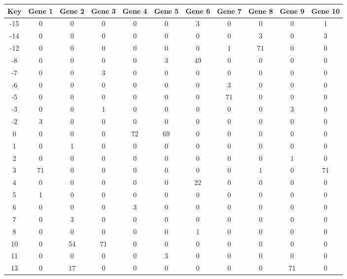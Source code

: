 \begin{tabular}{|c|c|c|c|c|c|c|c|c|c|c|}
\hline
Key & Gene 1 & Gene 2 & Gene 3 & Gene 4 & Gene 5 & Gene 6 & Gene 7 & Gene 8 & Gene 9 & Gene 10 \\
\hline
-15 & 0 & 0 & 0 & 0 & 0 & 3 & 0 & 0 & 0 & 1 \\
-14 & 0 & 0 & 0 & 0 & 0 & 0 & 0 & 3 & 0 & 3 \\
-12 & 0 & 0 & 0 & 0 & 0 & 0 & 1 & 71 & 0 & 0 \\
-8 & 0 & 0 & 0 & 0 & 3 & 49 & 0 & 0 & 0 & 0 \\
-7 & 0 & 0 & 3 & 0 & 0 & 0 & 0 & 0 & 0 & 0 \\
-6 & 0 & 0 & 0 & 0 & 0 & 0 & 3 & 0 & 0 & 0 \\
-5 & 0 & 0 & 0 & 0 & 0 & 0 & 71 & 0 & 0 & 0 \\
-3 & 0 & 0 & 1 & 0 & 0 & 0 & 0 & 0 & 3 & 0 \\
-2 & 3 & 0 & 0 & 0 & 0 & 0 & 0 & 0 & 0 & 0 \\
0 & 0 & 0 & 0 & 72 & 69 & 0 & 0 & 0 & 0 & 0 \\
1 & 0 & 1 & 0 & 0 & 0 & 0 & 0 & 0 & 0 & 0 \\
2 & 0 & 0 & 0 & 0 & 0 & 0 & 0 & 0 & 1 & 0 \\
3 & 71 & 0 & 0 & 0 & 0 & 0 & 0 & 1 & 0 & 71 \\
4 & 0 & 0 & 0 & 0 & 0 & 22 & 0 & 0 & 0 & 0 \\
5 & 1 & 0 & 0 & 0 & 0 & 0 & 0 & 0 & 0 & 0 \\
6 & 0 & 0 & 0 & 3 & 0 & 0 & 0 & 0 & 0 & 0 \\
7 & 0 & 3 & 0 & 0 & 0 & 0 & 0 & 0 & 0 & 0 \\
8 & 0 & 0 & 0 & 0 & 0 & 1 & 0 & 0 & 0 & 0 \\
10 & 0 & 54 & 71 & 0 & 0 & 0 & 0 & 0 & 0 & 0 \\
11 & 0 & 0 & 0 & 0 & 3 & 0 & 0 & 0 & 0 & 0 \\
13 & 0 & 17 & 0 & 0 & 0 & 0 & 0 & 0 & 71 & 0 \\
\hline
\end{tabular}